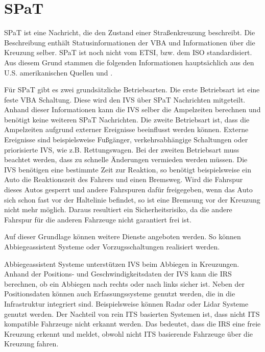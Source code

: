 \section{SPaT\label{sec:spat}}
\ac{SPaT} ist eine Nachricht, die den Zustand einer Straßenkreuzung beschreibt. Die Beschreibung enthält Statusinformationen der \ac{VBA} und Informationen über die Kreuzung selber. \ac{SPaT} ist noch nicht vom \ac{ETSI}, bzw. dem \ac{ISO} standardisiert. Aus diesem Grund stammen die folgenden Informationen hauptsächlich aus den U.S. amerikanischen Quellen \cite{usSpat} und \cite{usCaliforniaSpat}. 

Für \ac{SPaT} gibt es zwei grundsätzliche Betriebsarten. Die erste Betriebsart ist eine feste \ac{VBA} Schaltung. Diese wird den \ac{IVS} über \ac{SPaT} Nachrichten mitgeteilt. Anhand dieser Informationen kann die \ac{IVS} selber die Ampelzeiten berechnen und benötigt keine  weiteren \ac{SPaT} Nachrichten. Die zweite Betriebsart ist, dass die Ampelzeiten aufgrund externer Ereignisse beeinflusst werden können. Externe Ereignisse sind beispielsweise Fußgänger, verkehrsabhängige Schaltungen oder priorisierte \ac{IVS}, wie z.B. Rettungswagen. Bei der zweiten Betriebsart muss beachtet werden, dass zu schnelle Änderungen vermieden werden müssen. Die \ac{IVS} benötigen eine bestimmte Zeit zur Reaktion, so benötigt beispielsweise ein Auto die Reaktionszeit des Fahrers und einen Bremsweg. Wird die Fahrspur dieses Autos gesperrt und andere Fahrspuren dafür freigegeben, wenn das Auto sich schon fast vor der Haltelinie befindet, so ist eine Bremsung vor der Kreuzung nicht mehr möglich. Daraus resultiert ein Sicherheitsrisiko, da die andere Fahrspur für die anderen Fahrzeuge nicht garantiert frei ist. 

Auf dieser Grundlage können weitere Dienste angeboten werden. So können Abbiegeassistent Systeme oder Vorzugsschaltungen realisiert werden. 

 Abbiegeassistent Systeme unterstützen \ac{IVS} beim Abbiegen in Kreuzungen. Anhand der Positions- und Geschwindigkeitsdaten der \ac{IVS} kann die \ac{IRS} berechnen, ob ein Abbiegen nach rechts oder nach links sicher ist. Neben der Positionsdaten können auch Erfassungssysteme genutzt werden, die in die Infrastruktur integriert sind. Beispielsweise können \ac{Radar} oder \ac{Lidar} Systeme genutzt werden. Der Nachteil von rein \ac{ITS} basierten Systemen ist, dass nicht \ac{ITS} kompatible Fahrzeuge nicht erkannt werden. Das bedeutet, dass die \ac{IRS} eine freie Kreuzung erkennt und meldet, obwohl nicht \ac{ITS} basierende Fahrzeuge über die Kreuzung fahren. 
 
